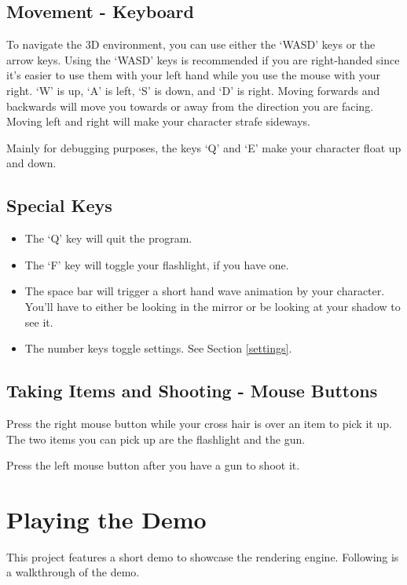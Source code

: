 \documentclass[oneside]{book}
\begin{document}
    \subsection{Movement - Keyboard}
      To navigate the 3D environment, you can use either the `WASD' keys or the arrow keys. Using the `WASD' keys is recommended if you are right-handed since it's easier to use them with your left hand while you use the mouse with your right. `W' is up, `A' is left, `S' is down, and `D' is right. Moving forwards and backwards will move you towards or away from the direction you are facing. Moving left and right will make your character strafe sideways.

      Mainly for debugging purposes, the keys `Q' and `E' make your character float up and down.

    \subsection{Special Keys}
      \begin{itemize}
        \item The `Q' key will quit the program.
        \item The `F' key will toggle your flashlight, if you have one.
        \item The space bar will trigger a short hand wave animation by your character. You'll have to either be looking in the mirror or be looking at your shadow to see it.
        \item The number keys toggle settings. See Section \ref{settings}.
      \end{itemize}

    \subsection{Taking Items and Shooting - Mouse Buttons}
      Press the right mouse button while your cross hair is over an item to pick it up. The two items you can pick up are the flashlight and the gun.

      Press the left mouse button after you have a gun to shoot it.

  \section{Playing the Demo}
    This project features a short demo to showcase the rendering engine. Following is a walkthrough of the demo.
\end{document}
